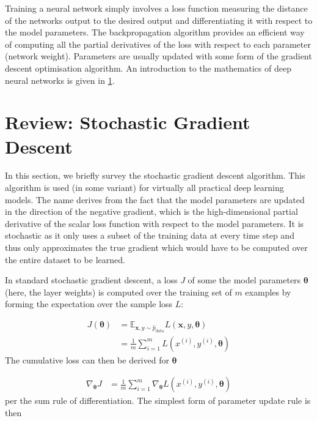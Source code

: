 Training a neural network simply involves a loss function measuring the distance
of the networks output to the desired output and differentiating it with respect
to the model parameters. The backpropagation algorithm provides an efficient way
of computing all the partial derivatives of the loss with respect to each
parameter (network weight). Parameters are usually updated with some form of the
gradient descent optimisation algorithm. An introduction to the mathematics of
deep neural networks is given in \cref{sec:review_stochastic_gradient_descent}.

\section{Review: Stochastic Gradient Descent}%
\label{sec:review_stochastic_gradient_descent}

In this section, we briefly survey the stochastic gradient descent algorithm.
This algorithm is used (in some variant) for virtually all practical deep
learning models. The name derives from the fact that the model parameters are
updated in the direction of the negative gradient, which is the high-dimensional
partial derivative of the scalar loss function with respect to the model parameters. It
is stochastic as it only uses a subset of the training data at every time step
and thus only approximates the true gradient which would have to be computed
over the entire dataset to be learned.

In standard stochastic gradient descent, a loss $J$ of some the
model parameters $\boldsymbol\theta$ (here, the layer weights) is computed over the training set of $m$
examples by forming the expectation over the sample loss $L$:

\begin{align}
    J(\boldsymbol\theta) &= \mathbb{E}_{\mathbf{x},y\sim\hat{p}_{\text{data}}} L(\mathbf{x}, y, \boldsymbol\theta) \\
                         &= \frac{1}{m}\sum_{i=1}^{m}L(x^{(i)}, y^{(i)}, \boldsymbol\theta)
\end{align}
The cumulative loss can then be derived for $\boldsymbol\theta$

\begin{align}
    \nabla_{\boldsymbol\theta}J &= \frac{1}{m}\sum_{i=1}^{m}\nabla_{\boldsymbol\theta}L(x^{(i)}, y^{(i)}, \boldsymbol\theta)
\end{align}
per the sum rule of differentiation. The simplest form of parameter update rule
is then

